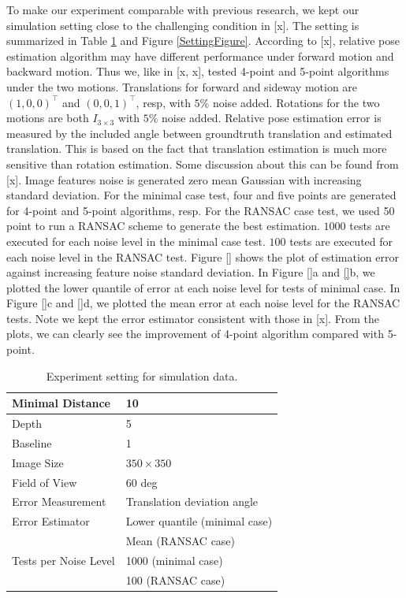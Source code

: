 \documentclass[letterpaper, 10 pt, conference]{ieeeconf}
\begin{document}
To make our experiment comparable with previous research, we kept our simulation setting close to the challenging condition in [x]. The setting is summarized in Table \ref{SettingTable} and Figure \ref{SettingFigure}. According to [x], relative pose estimation algorithm may have different performance under forward motion and backward motion. Thus we, like in [x, x], tested 4-point and 5-point algorithms under the two motions. Translations for forward and sideway motion are $(1, 0, 0)^\top$ and $(0, 0, 1)^\top$, resp, with $5\%$ noise added. Rotations for the two motions are both $I_{3 \times 3}$ with $5\%$ noise added. Relative pose estimation error is measured by the included angle between groundtruth translation and estimated translation. This is based on the fact that translation estimation is much more sensitive than rotation estimation. Some discussion about this can be found from [x]. Image features noise is generated zero mean Gaussian with increasing standard deviation. For the minimal case test, four and five points are generated for 4-point and 5-point algorithms, resp. For the RANSAC case test, we used 50 point to run a RANSAC scheme to generate the best estimation. $1000$ tests are executed for each noise level in the minimal case test. $100$ tests are executed for each noise level in the RANSAC test. Figure \ref{} shows the plot of estimation error against increasing feature noise standard deviation.  In Figure \ref{}a and \ref{}b, we plotted the lower quantile of error at each noise level for tests of minimal case. In Figure \ref{}c and \ref{}d, we plotted the mean error at each noise level for the RANSAC tests. Note we kept the error estimator consistent with those in [x]. From the plots, we can clearly see the improvement of 4-point algorithm compared with 5-point. 

\begin{table}
\caption{Experiment setting for simulation data. }
\begin{center}
\begin{tabular}{|l|l|}
	\hline	
	Minimal Distance & 10 \\
	\hline
	Depth & 5 \\
	\hline
	Baseline & 1 \\
	\hline
	Image Size & $350 \times 350$ \\ 
	\hline	
	Field of View & 60 deg \\
	\hline	
	Error Measurement & Translation deviation angle \\ 
	\hline	
	Error Estimator & Lower quantile (minimal case) \\
	& Mean (RANSAC case) \\
	\hline
	Tests per Noise Level & 1000 (minimal case) \\
	& 100 (RANSAC case) \\
	\hline	
\end{tabular} 
\end{center}
\label{SettingTable}
\end{table}
\end{document}
